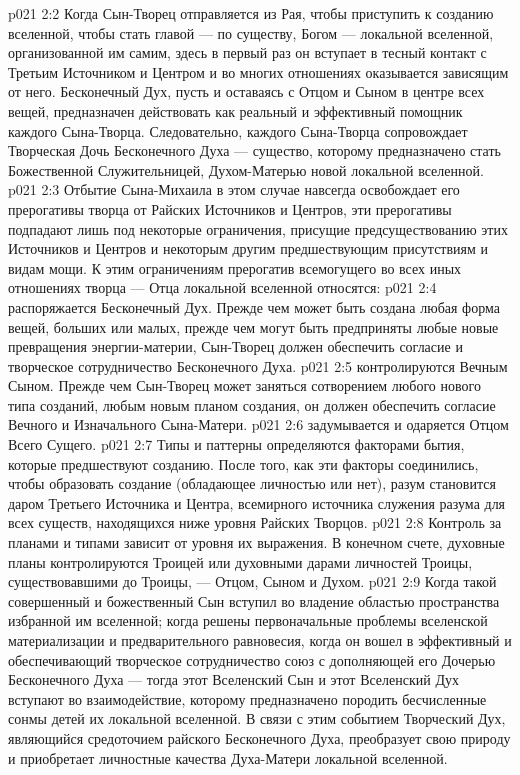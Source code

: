 \vs p021 2:2 \pc Когда Сын\hyp{}Творец отправляется из Рая, чтобы приступить к созданию вселенной, чтобы стать главой --- по существу, Богом --- локальной вселенной, организованной им самим, здесь в первый раз он вступает в тесный контакт с Третьим Источником и Центром и во многих отношениях оказывается зависящим от него. Бесконечный Дух, пусть и оставаясь с Отцом и Сыном в центре всех вещей, предназначен действовать как реальный и эффективный помощник каждого Сына\hyp{}Творца. Следовательно, каждого Сына\hyp{}Творца сопровождает Творческая Дочь Бесконечного Духа --- существо, которому предназначено стать Божественной Служительницей, Духом\hyp{}Матерью новой локальной вселенной.
\vs p021 2:3 Отбытие Сына\hyp{}Михаила в этом случае навсегда освобождает его прерогативы творца от Райских Источников и Центров, эти прерогативы подпадают лишь под некоторые ограничения, присущие предсуществованию этих Источников и Центров и некоторым другим предшествующим присутствиям и видам мощи. К этим ограничениям прерогатив всемогущего во всех иных отношениях творца --- Отца локальной вселенной относятся:
\vs p021 2:4 \bibnobreakspace {} распоряжается Бесконечный Дух. Прежде чем может быть создана любая форма вещей, больших или малых, прежде чем могут быть предприняты любые новые превращения энергии\hyp{}материи, Сын\hyp{}Творец должен обеспечить согласие и творческое сотрудничество Бесконечного Духа.
\vs p021 2:5 \bibnobreakspace {} контролируются Вечным Сыном. Прежде чем Сын\hyp{}Творец может заняться сотворением любого нового типа созданий, любым новым планом создания, он должен обеспечить согласие Вечного и Изначального Сына\hyp{}Матери.
\vs p021 2:6 \bibnobreakspace {} задумывается и одаряется Отцом Всего Сущего.
\vs p021 2:7 \pc Типы и паттерны  определяются факторами бытия, которые предшествуют созданию. После того, как эти факторы соединились, чтобы образовать создание (обладающее личностью или нет), разум становится даром Третьего Источника и Центра, всемирного источника служения разума для всех существ, находящихся ниже уровня Райских Творцов.
\vs p021 2:8 \pc Контроль за планами и типами  зависит от уровня их выражения. В конечном счете, духовные планы контролируются Троицей или духовными дарами личностей Троицы, существовавшими до Троицы, --- Отцом, Сыном и Духом.
\vs p021 2:9 \pc Когда такой совершенный и божественный Сын вступил во владение областью пространства избранной им вселенной; когда решены первоначальные проблемы вселенской материализации и предварительного равновесия, когда он вошел в эффективный и обеспечивающий творческое сотрудничество союз с дополняющей его Дочерью Бесконечного Духа --- тогда этот Вселенский Сын и этот Вселенский Дух вступают во взаимодействие, которому предназначено породить бесчисленные сонмы детей их локальной вселенной. В связи с этим событием Творческий Дух, являющийся средоточием райского Бесконечного Духа, преобразует свою природу и приобретает личностные качества Духа\hyp{}Матери локальной вселенной.
